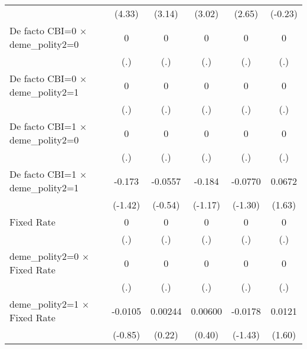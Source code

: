 \begin{table}[htbp]
\begin{tabular}{l*{5}{c}}
                                        &   (4.33)         &   (3.14)         &   (3.02)         &   (2.65)         &  (-0.23)         \\
\addlinespace
De facto CBI=0 $\times$ deme\_polity2=0  &        0         &        0         &        0         &        0         &        0         \\
                                        &      (.)         &      (.)         &      (.)         &      (.)         &      (.)         \\
\addlinespace
De facto CBI=0 $\times$ deme\_polity2=1  &        0         &        0         &        0         &        0         &        0         \\
                                        &      (.)         &      (.)         &      (.)         &      (.)         &      (.)         \\
\addlinespace
De facto CBI=1 $\times$ deme\_polity2=0  &        0         &        0         &        0         &        0         &        0         \\
                                        &      (.)         &      (.)         &      (.)         &      (.)         &      (.)         \\
\addlinespace
De facto CBI=1 $\times$ deme\_polity2=1  &   -0.173         &  -0.0557         &   -0.184         &  -0.0770         &   0.0672         \\
                                        &  (-1.42)         &  (-0.54)         &  (-1.17)         &  (-1.30)         &   (1.63)         \\
\addlinespace
Fixed Rate                              &        0         &        0         &        0         &        0         &        0         \\
                                        &      (.)         &      (.)         &      (.)         &      (.)         &      (.)         \\
\addlinespace
deme\_polity2=0 $\times$ Fixed Rate      &        0         &        0         &        0         &        0         &        0         \\
                                        &      (.)         &      (.)         &      (.)         &      (.)         &      (.)         \\
\addlinespace
deme\_polity2=1 $\times$ Fixed Rate      &  -0.0105         &  0.00244         &  0.00600         &  -0.0178         &   0.0121         \\
                                        &  (-0.85)         &   (0.22)         &   (0.40)         &  (-1.43)         &   (1.60)         \\

\end{tabular}
\end{table}

